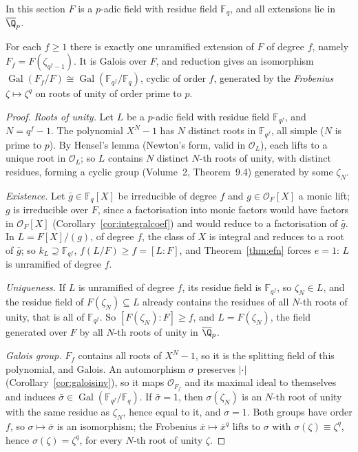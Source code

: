 In this section $F$ is a $p$-adic field with residue field $\mathbb F_q$, and all extensions lie in $\overline{\Q}_p$.

\begin{theorem}\label{thm:unram}
For each $f\ge1$ there is exactly one unramified extension of $F$ of degree $f$, namely $F_f=F(\zeta_{q^f-1})$. It is Galois
over $F$, and reduction gives an isomorphism $\operatorname{Gal}(F_f/F)\cong\operatorname{Gal}(\mathbb F_{q^f}/\mathbb F_q)$,
cyclic of order $f$, generated by the \emph{Frobenius} $\zeta\mapsto\zeta^q$ on roots of unity of order prime to $p$.
\end{theorem}
\begin{proof}
\emph{Roots of unity.} Let $L$ be a $p$-adic field with residue field $\mathbb F_{q^f}$, and $N=q^f-1$. The polynomial $X^N-1$
has $N$ distinct roots in $\mathbb F_{q^f}$, all simple ($N$ is prime to $p$). By Hensel's lemma (Newton's form, valid in $\mathcal
O_L$), each lifts to a unique root in $\mathcal O_L$; so $L$ contains $N$ distinct $N$-th roots of unity, with distinct
residues, forming a cyclic group (Volume~2, Theorem~9.4) generated by some $\zeta_N$.

\emph{Existence.} Let $\bar g\in\mathbb F_q[X]$ be irreducible of degree $f$ and $g\in\mathcal O_F[X]$ a monic lift; $g$ is
irreducible over $F$, since a factorisation into monic factors would have factors in $\mathcal O_F[X]$ (Corollary~\ref{cor:integralcoef})
and would reduce to a factorisation of $\bar g$. In $L=F[X]/(g)$, of degree $f$, the class of $X$ is integral and reduces to a
root of $\bar g$; so $k_L\supseteq\mathbb F_{q^f}$, $f(L/F)\ge f=[L:F]$, and Theorem~\ref{thm:efn} forces $e=1$: $L$ is
unramified of degree $f$.

\emph{Uniqueness.} If $L$ is unramified of degree $f$, its residue field is $\mathbb F_{q^f}$, so $\zeta_N\in L$, and the residue
field of $F(\zeta_N)\subseteq L$ already contains the residues of all $N$-th roots of unity, that is all of $\mathbb F_{q^f}$. So
$[F(\zeta_N):F]\ge f$, and $L=F(\zeta_N)$, the field generated over $F$ by all $N$-th roots of unity in $\overline{\Q}_p$.

\emph{Galois group.} $F_f$ contains all roots of $X^N-1$, so it is the splitting field of this polynomial, and Galois.
An automorphism $\sigma$ preserves $|\cdot|$ (Corollary~\ref{cor:galoisinv}), so it maps $\mathcal O_{F_f}$ and its maximal ideal to
themselves and induces $\bar\sigma\in\operatorname{Gal}(\mathbb F_{q^f}/\mathbb F_q)$. If $\bar\sigma=1$, then $\sigma(\zeta_N)$ is an
$N$-th root of unity with the same residue as $\zeta_N$, hence equal to it, and $\sigma=1$. Both groups have order $f$, so
$\sigma\mapsto\bar\sigma$ is an isomorphism; the Frobenius $\bar x\mapsto\bar x^q$ lifts to $\sigma$ with $\sigma(\zeta)\equiv
\zeta^q$, hence $\sigma(\zeta)=\zeta^q$, for every $N$-th root of unity $\zeta$.
\end{proof}

